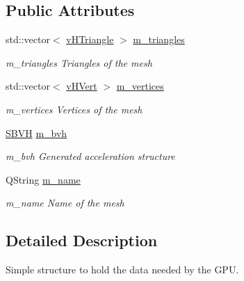 \subsection*{Public Attributes}
\begin{DoxyCompactItemize}
\item 
\hypertarget{structvMeshData_a9b71b0f933387ec2d4a551cbf649ba6a}{std\-::vector$<$ \hyperlink{structvHTriangle}{v\-H\-Triangle} $>$ \hyperlink{structvMeshData_a9b71b0f933387ec2d4a551cbf649ba6a}{m\-\_\-triangles}}\label{structvMeshData_a9b71b0f933387ec2d4a551cbf649ba6a}

\begin{DoxyCompactList}\small\item\em m\-\_\-triangles Triangles of the mesh \end{DoxyCompactList}\item 
\hypertarget{structvMeshData_a580438b3578af1943217d2dddd2f60bf}{std\-::vector$<$ \hyperlink{structvHVert}{v\-H\-Vert} $>$ \hyperlink{structvMeshData_a580438b3578af1943217d2dddd2f60bf}{m\-\_\-vertices}}\label{structvMeshData_a580438b3578af1943217d2dddd2f60bf}

\begin{DoxyCompactList}\small\item\em m\-\_\-vertices Vertices of the mesh \end{DoxyCompactList}\item 
\hypertarget{structvMeshData_a0e3db8fa9921c618ce54d477d24bd316}{\hyperlink{classSBVH}{S\-B\-V\-H} \hyperlink{structvMeshData_a0e3db8fa9921c618ce54d477d24bd316}{m\-\_\-bvh}}\label{structvMeshData_a0e3db8fa9921c618ce54d477d24bd316}

\begin{DoxyCompactList}\small\item\em m\-\_\-bvh Generated acceleration structure \end{DoxyCompactList}\item 
\hypertarget{structvMeshData_a84cab94917191b88a3888dd60cfd9e88}{Q\-String \hyperlink{structvMeshData_a84cab94917191b88a3888dd60cfd9e88}{m\-\_\-name}}\label{structvMeshData_a84cab94917191b88a3888dd60cfd9e88}

\begin{DoxyCompactList}\small\item\em m\-\_\-name Name of the mesh \end{DoxyCompactList}\end{DoxyCompactItemize}


\subsection{Detailed Description}
Simple structure to hold the data needed by the G\-P\-U. 

